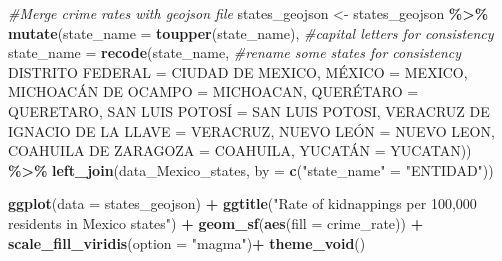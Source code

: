 \documentclass[
]{article}
\newenvironment{Shaded}{\begin{snugshade}}{\end{snugshade}}
\newcommand{\AttributeTok}[1]{\textcolor[rgb]{0.13,0.29,0.53}{#1}}
\newcommand{\CommentTok}[1]{\textcolor[rgb]{0.56,0.35,0.01}{\textit{#1}}}
\newcommand{\FunctionTok}[1]{\textcolor[rgb]{0.13,0.29,0.53}{\textbf{#1}}}
\newcommand{\NormalTok}[1]{#1}
\newcommand{\OtherTok}[1]{\textcolor[rgb]{0.56,0.35,0.01}{#1}}
\newcommand{\SpecialCharTok}[1]{\textcolor[rgb]{0.81,0.36,0.00}{\textbf{#1}}}
\newcommand{\StringTok}[1]{\textcolor[rgb]{0.31,0.60,0.02}{#1}}
\begin{document}
\begin{Shaded}
\begin{Highlighting}[]
\CommentTok{\#Merge crime rates with geojson file}
\NormalTok{states\_geojson }\OtherTok{\textless{}{-}}\NormalTok{ states\_geojson }\SpecialCharTok{\%\textgreater{}\%}
  \FunctionTok{mutate}\NormalTok{(}\AttributeTok{state\_name =} \FunctionTok{toupper}\NormalTok{(state\_name), }\CommentTok{\#capital letters for consistency}
         \AttributeTok{state\_name =} \FunctionTok{recode}\NormalTok{(state\_name, }\CommentTok{\#rename some states for consistency}
                             \StringTok{\textquotesingle{}DISTRITO FEDERAL\textquotesingle{}} \OtherTok{=} \StringTok{\textquotesingle{}CIUDAD DE MEXICO\textquotesingle{}}\NormalTok{,}
                             \StringTok{\textquotesingle{}MÉXICO\textquotesingle{}} \OtherTok{=} \StringTok{\textquotesingle{}MEXICO\textquotesingle{}}\NormalTok{,}
                             \StringTok{\textquotesingle{}MICHOACÁN DE OCAMPO\textquotesingle{}} \OtherTok{=} \StringTok{\textquotesingle{}MICHOACAN\textquotesingle{}}\NormalTok{,}
                             \StringTok{\textquotesingle{}QUERÉTARO\textquotesingle{}} \OtherTok{=} \StringTok{\textquotesingle{}QUERETARO\textquotesingle{}}\NormalTok{,}
                             \StringTok{\textquotesingle{}SAN LUIS POTOSÍ\textquotesingle{}} \OtherTok{=} \StringTok{\textquotesingle{}SAN LUIS POTOSI\textquotesingle{}}\NormalTok{,}
                             \StringTok{\textquotesingle{}VERACRUZ DE IGNACIO DE LA LLAVE\textquotesingle{}} \OtherTok{=} \StringTok{\textquotesingle{}VERACRUZ\textquotesingle{}}\NormalTok{,}
                             \StringTok{\textquotesingle{}NUEVO LEÓN\textquotesingle{}} \OtherTok{=} \StringTok{\textquotesingle{}NUEVO LEON\textquotesingle{}}\NormalTok{,}
                             \StringTok{\textquotesingle{}COAHUILA DE ZARAGOZA\textquotesingle{}} \OtherTok{=} \StringTok{\textquotesingle{}COAHUILA\textquotesingle{}}\NormalTok{,}
                             \StringTok{\textquotesingle{}YUCATÁN\textquotesingle{}} \OtherTok{=} \StringTok{\textquotesingle{}YUCATAN\textquotesingle{}}\NormalTok{)) }\SpecialCharTok{\%\textgreater{}\%} 
  \FunctionTok{left\_join}\NormalTok{(data\_Mexico\_states, }\AttributeTok{by =} \FunctionTok{c}\NormalTok{(}\StringTok{"state\_name"} \OtherTok{=} \StringTok{"ENTIDAD"}\NormalTok{))}
\end{Highlighting}
\end{Shaded}

\begin{Shaded}
\begin{Highlighting}[]
\FunctionTok{ggplot}\NormalTok{(}\AttributeTok{data =}\NormalTok{ states\_geojson) }\SpecialCharTok{+}
  \FunctionTok{ggtitle}\NormalTok{(}\StringTok{"Rate of kidnappings per 100,000 residents in Mexico states"}\NormalTok{) }\SpecialCharTok{+}
  \FunctionTok{geom\_sf}\NormalTok{(}\FunctionTok{aes}\NormalTok{(}\AttributeTok{fill =}\NormalTok{ crime\_rate)) }\SpecialCharTok{+}
  \FunctionTok{scale\_fill\_viridis}\NormalTok{(}\AttributeTok{option =} \StringTok{"magma"}\NormalTok{)}\SpecialCharTok{+}
  \FunctionTok{theme\_void}\NormalTok{()}
\end{Highlighting}
\end{Shaded}
\end{document}
